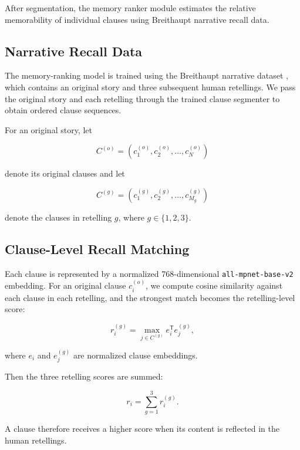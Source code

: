 \documentclass[conference]{IEEEtran}
\begin{document}
After segmentation, the memory ranker module estimates the relative memorability of individual clauses using Breithaupt narrative recall data.

\subsection{Narrative Recall Data}

The memory-ranking model is trained using the Breithaupt narrative dataset \cite{he2023}, which contains an original story and three subsequent human retellings. We pass the original story and each retelling through the trained clause segmenter to obtain ordered clause sequences.

For an original story, let

\begin{equation}
C^{(o)}=(c^{(o)}_1,c^{(o)}_2,\ldots,c^{(o)}_N)
\end{equation}

denote its original clauses and let

\begin{equation}
C^{(g)}=(c^{(g)}_1,c^{(g)}_2,\ldots,c^{(g)}_{M_g})
\end{equation}

denote the clauses in retelling $g$, where $g\in\{1,2,3\}$.

\subsection{Clause-Level Recall Matching}

Each clause is represented by a normalized 768-dimensional \texttt{all-mpnet-base-v2} embedding. For an original clause $c^{(o)}_i$, we compute cosine similarity against each clause in each retelling, and the strongest match becomes the retelling-level score:

\begin{equation}
r_i^{(g)}
=
\max_{j\in C^{(g)}}e_i^\mathsf{T}e_j^{(g)},
\end{equation}

where $e_i$ and $e_j^{(g)}$ are normalized clause embeddings.

Then the three retelling scores are summed:

\begin{equation}
r_i =
\sum_{g=1}^{3}r_i^{(g)}.
\end{equation}

A clause therefore receives a higher score when its content is reflected in the human retellings. 
\end{document}
